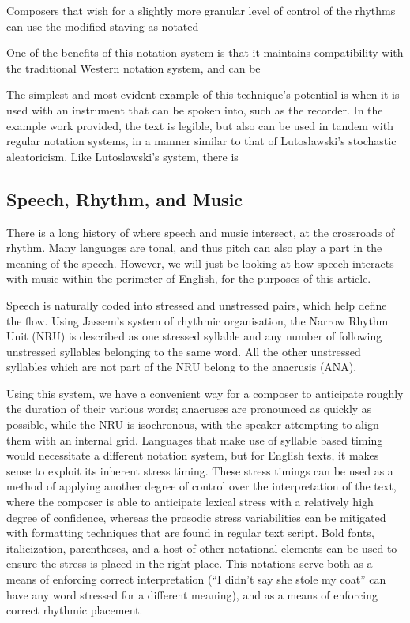 Composers that wish for a slightly more granular level of control of the rhythms can use the modified staving as notated 

One of the benefits of this notation system is that it maintains compatibility with the traditional Western notation system, and can be 

The simplest and most evident example of this technique's potential is when it is used with an instrument that can be spoken into, such as the recorder. 
In the example work provided, the text is legible, but also can be used in tandem with regular notation systems, in a manner similar to that of Lutoslawski's stochastic aleatoricism. 
Like Lutoslawski's system, there is 

\subsection{Speech, Rhythm, and Music}
There is a long history of where speech and music intersect, at the crossroads of rhythm. 
Many languages are tonal, and thus pitch can also play a part in the meaning of the speech. 
However, we will just be looking at how speech interacts with music within the perimeter of English, for the purposes of this article. 

Speech is naturally coded into stressed and unstressed pairs, which help define the flow. 
Using Jassem's system of rhythmic organisation, the Narrow Rhythm Unit (NRU) is described as one stressed syllable and any number of following unstressed syllables belonging to the same word.\autocite[]{hillResultsPreliminaryStudy1977}
All the other unstressed syllables which are not part of the NRU belong to the anacrusis (ANA). 

Using this system, we have a convenient way for a composer to anticipate roughly the duration of their various words; anacruses are pronounced as quickly as possible, while the NRU is isochronous, with the speaker attempting to align them with an internal grid. 
Languages that make use of syllable based timing would necessitate a different notation system, but for English texts, it makes sense to exploit its inherent stress timing. 
These stress timings can be used as a method of applying another degree of control over the interpretation of the text, where the composer is able to anticipate lexical stress with a relatively high degree of confidence, whereas the prosodic stress variabilities can be mitigated with formatting techniques that are found in regular text script.
Bold fonts, italicization, parentheses, and a host of other notational elements can be used to ensure the stress is placed in the right place. 
This notations serve both as a means of enforcing correct interpretation (``I didn't say she stole my coat'' can have any word stressed for a different meaning), and as a means of enforcing correct rhythmic placement.

